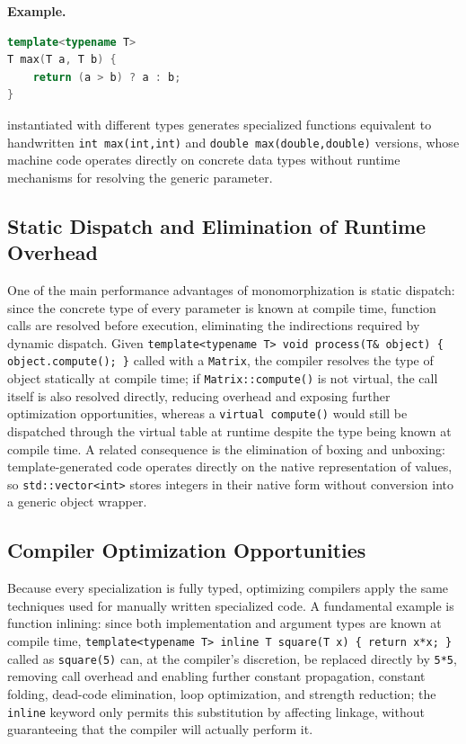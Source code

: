 \documentclass[11pt]{report}
\begin{document}
\begin{examplebox}
\textbf{Example.}
\begin{lstlisting}[language=C++]
template<typename T>
T max(T a, T b) {
    return (a > b) ? a : b;
}
\end{lstlisting}

instantiated with different types generates specialized functions equivalent to
handwritten \texttt{int max(int,int)} and \texttt{double max(double,double)}
versions, whose machine code operates directly on concrete data types without
runtime mechanisms for resolving the generic parameter.
\end{examplebox}

\subsection{Static Dispatch and Elimination of Runtime Overhead}
\label{CppTemplates:Performance:DispatchEliminationOverhead}

One of the main performance advantages of monomorphization is static dispatch:
since the concrete type of every parameter is known at compile time, function
calls are resolved before execution, eliminating the indirections required by
dynamic dispatch. 
Given \texttt{template<typename T> void process(T\& object) \{
object.compute(); \}} called with a \texttt{Matrix}, the compiler
resolves the type of object statically at
compile time; if \texttt{Matrix::compute()} is not virtual, the call itself is also
resolved directly, reducing overhead and exposing further optimization
opportunities, whereas a \texttt{virtual compute()} would still be dispatched through
the virtual table at runtime despite the type being known at compile time.
A related consequence is the elimination of
boxing and unboxing: template-generated code operates directly on the native
representation of values, so \texttt{std::vector<int>} stores integers in their
native form without conversion into a generic object wrapper.

\subsection{Compiler Optimization Opportunities}
\label{CppTemplates:Performance:Optimization}

Because every specialization is fully typed, optimizing compilers apply the same
techniques used for manually written specialized code. 
A fundamental example is function inlining: since both implementation and
argument types are known at compile time, \texttt{template<typename T> inline
T square(T x) \{ return x*x; \}} called as \texttt{square(5)} can, at the
compiler's discretion, be replaced directly by \texttt{5*5}, removing call
overhead and enabling further constant propagation, constant folding,
dead-code elimination, loop optimization, and strength reduction; the
\texttt{inline} keyword only permits this substitution by affecting linkage,
without guaranteeing that the compiler will actually perform it.
\end{document}
